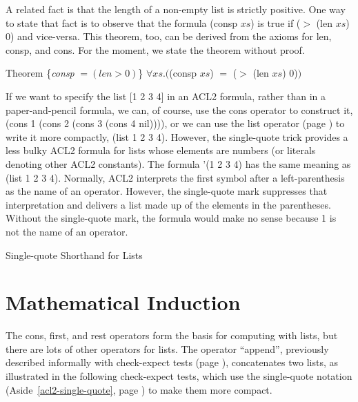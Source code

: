 A related fact is that the length of a non-empty list is strictly positive.
One way to state that fact is to observe that the formula (consp $xs$) is true
if ($>$ (len $xs$) 0) and vice-versa. %
This theorem, too, can be derived from the axioms for
len, consp, and cons. For the moment,
we state the theorem without proof.
\begin{samepage}
\label{consp-len-thm}
\begin{center}
Theorem \{\emph{consp} $= (len > 0)$\} $\forall xs.($(consp $xs$) $=$ ($>$ (len $xs$) 0)$)$
\end{center}
\end{samepage}

\begin{aside}
If we want to specify the list [1 2 3 4] in an ACL2 formula,
rather than in a paper-and-pencil formula,
we can, of course, use the cons operator to construct it,
(cons 1 (cons 2 (cons 3 (cons 4 nil)))),
or we can use the list operator (page \pageref{list-op-informal}) to write it more compactly,
(list 1 2 3 4).
However, the single-quote trick provides a less bulky ACL2 formula for lists
whose elements are numbers (or literals denoting other ACL2 constants).
The formula
'(1 2 3 4) has the same meaning as (list 1 2 3 4).
Normally, ACL2 interprets the first symbol after a left-parenthesis
as the name of an operator.
However, the single-quote mark suppresses that interpretation and
delivers a list made up of the elements in the parentheses.
Without the single-quote mark,
the formula would make no sense because 1 is not the name of an operator.
\caption{Single-quote Shorthand for Lists}
\label{acl2-single-quote}
\end{aside}

\section{Mathematical Induction}
\label{sec:induction}
The cons, first, and rest operators form the basis for computing with lists,
but there are lots of other operators for lists.
The operator ``append'', previously described informally with check-expect tests
(page \pageref{append-op-informal}), concatenates two lists, as illustrated
in the following check-expect tests,
which use the single-quote notation (Aside~\ref{acl2-single-quote}, page \pageref{acl2-single-quote})
to make them more compact.


